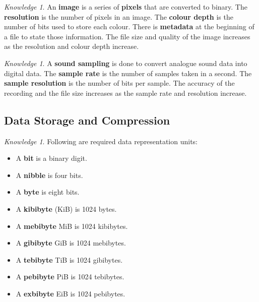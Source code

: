 \documentclass[8pt]{article}
\theoremstyle{remark}
\newtheorem{knowledge}[method]{Knowledge}
\begin{document}
        \begin{knowledge}
            An \textbf{image} is a series of \textbf{pixels} that are converted to binary. The \textbf{resolution} is the number of pixels in an image. The \textbf{colour depth} is the number of bits used to store each colour. There is \textbf{metadata} at the beginning of a file to state those information. The file size and quality of the image increases as the resolution and colour depth increase.
        \end{knowledge}

        \begin{knowledge}
            A \textbf{sound sampling} is done to convert analogue sound data into digital data. The \textbf{sample rate} is the number of samples taken in a second. The \textbf{sample resolution} is the number of bits per sample. The accuracy of the recording and the file size increases as the sample rate and resolution increase.
        \end{knowledge}

        \subsection{Data Storage and Compression}

        \begin{knowledge}
            Following are required data representation units:
            \begin{itemize}
                \item A \textbf{bit} is a binary digit.
                \item A \textbf{nibble} is four bits.
                \item A \textbf{byte} is eight bits.
                \item A \textbf{kibibyte} (KiB) is 1024 bytes.
                \item A \textbf{mebibyte} {MiB} is 1024 kibibytes.
                \item A \textbf{gibibyte} {GiB} is 1024 mebibytes.
                \item A \textbf{tebibyte} {TiB} is 1024 gibibytes.
                \item A \textbf{pebibyte} {PiB} is 1024 tebibytes.
                \item A \textbf{exbibyte} {EiB} is 1024 pebibytes.
            \end{itemize}
        \end{knowledge}
\end{document}
